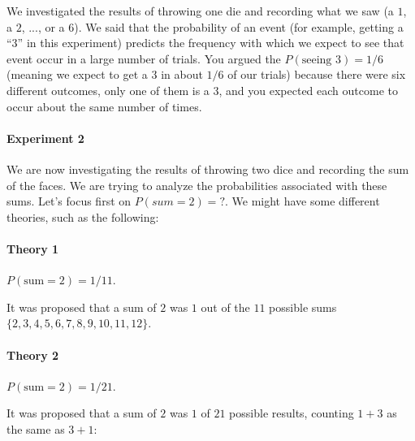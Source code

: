We investigated the results of throwing one die and recording what we
saw (a $1$, a $2$, ..., or a $6$). We said that the probability of an
event (for example, getting a ``3'' in this experiment) predicts the
frequency with which we expect to see that event occur in a large
number of trials. You argued the $P(\text{seeing }3)=1/6$ (meaning we
expect to get a $3$ in about $1/6$ of our trials) because there were
six different outcomes, only one of them is a $3$, and you expected
each outcome to occur about the same number of times.

\paragraph{Experiment 2}
We are now investigating the results of throwing two dice and
recording the sum of the faces. We are trying to analyze the
probabilities associated with these sums.  Let's focus first on
$P(sum=2)=?$. We might have some different theories, such 
as the following:


\paragraph{Theory 1} 
$P(\text{sum}=2)=1/11$. 

It was proposed that a sum of $2$ was $1$ out
of the $11$ possible sums $\{2,3,4,5,6,7,8,9,10,11,12\}$.


%

\paragraph{Theory 2} 
$P(\text{sum}=2)=1/21$. 

It was proposed that a sum of $2$ was $1$ of
$21$ possible results, counting $1+3$ as the same as $3+1$:

